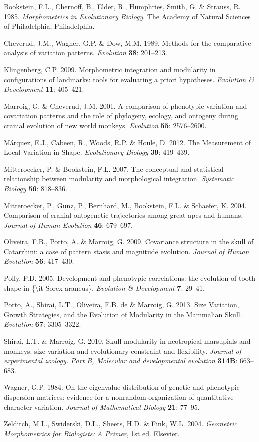 \documentclass[12pt,]{article}
\begin{document}
Bookstein, F.L., Chernoff, B., Elder, R., Humphries, Smith, G. \&
Strauss, R. 1985. \emph{Morphometrics in Evolutionary Biology}. The
Academy of Natural Sciences of Philadelphia, Philadelphia.

Cheverud, J.M., Wagner, G.P. \& Dow, M.M. 1989. Methods for the
comparative analysis of variation patterns. \emph{Evolution}
\textbf{38}: 201--213.

Klingenberg, C.P. 2009. Morphometric integration and modularity in
configurations of landmarks: tools for evaluating a priori hypotheses.
\emph{Evolution \& Development} \textbf{11}: 405--421.

Marroig, G. \& Cheverud, J.M. 2001. A comparison of phenotypic variation
and covariation patterns and the role of phylogeny, ecology, and
ontogeny during cranial evolution of new world monkeys. \emph{Evolution}
\textbf{55}: 2576--2600.

Márquez, E.J., Cabeen, R., Woods, R.P. \& Houle, D. 2012. The
Measurement of Local Variation in Shape. \emph{Evolutionary Biology}
\textbf{39}: 419--439.

Mitteroecker, P. \& Bookstein, F.L. 2007. The conceptual and statistical
relationship between modularity and morphological integration.
\emph{Systematic Biology} \textbf{56}: 818--836.

Mitteroecker, P., Gunz, P., Bernhard, M., Bookstein, F.L. \& Schaefer,
K. 2004. Comparison of cranial ontogenetic trajectories among great apes
and humans. \emph{Journal of Human Evolution} \textbf{46}: 679--697.

Oliveira, F.B., Porto, A. \& Marroig, G. 2009. Covariance structure in
the skull of Catarrhini: a case of pattern stasis and magnitude
evolution. \emph{Journal of Human Evolution} \textbf{56}: 417--430.

Polly, P.D. 2005. Development and phenotypic correlations: the evolution
of tooth shape in \{\textbackslash{}it Sorex araneus\}. \emph{Evolution
\& Development} \textbf{7}: 29--41.

Porto, A., Shirai, L.T., Oliveira, F.B. de \& Marroig, G. 2013. Size
Variation, Growth Strategies, and the Evolution of Modularity in the
Mammalian Skull. \emph{Evolution} \textbf{67}: 3305--3322.

Shirai, L.T. \& Marroig, G. 2010. Skull modularity in neotropical
marsupials and monkeys: size variation and evolutionary constraint and
flexibility. \emph{Journal of experimental zoology. Part B, Molecular
and developmental evolution} \textbf{314B}: 663--683.

Wagner, G.P. 1984. On the eigenvalue distribution of genetic and
phenotypic dispersion matrices: evidence for a nonrandom organization of
quantitative character variation. \emph{Journal of Mathematical Biology}
\textbf{21}: 77--95.

Zelditch, M.L., Swiderski, D.L., Sheets, H.D. \& Fink, W.L. 2004.
\emph{Geometric Morphometrics for Biologists: A Primer}, 1st ed.
Elsevier.
\end{document}
